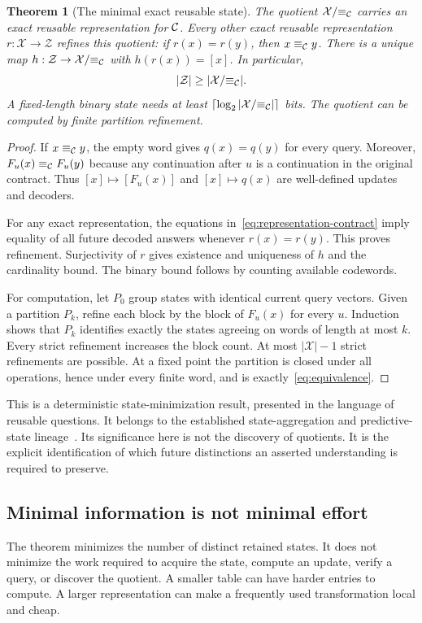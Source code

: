 \documentclass[11pt,letterpaper]{article}
\theoremstyle{plain}
\newtheorem{theorem}{Theorem}[section]
\theoremstyle{definition}
\newcommand{\X}{\mathcal X}\newcommand{\Z}{\mathcal Z}
\newcommand{\Eq}{\equiv_{\C}}\newcommand{\supp}{\operatorname{supp}}
\begin{document}
\begin{theorem}[The minimal exact reusable state]\label{thm:quotient}
The quotient $\X/{\Eq}$ carries an exact reusable representation for $\mathcal C$. Every other exact reusable representation $r:\X\to\Z$ refines this quotient: if $r(x)=r(y)$, then $x\Eq y$. There is a unique map $h:\Z\to\X/{\Eq}$ with $h(r(x))=[x]$. In particular,
\[
|\Z|\geq|\X/{\Eq}|.
\]
A fixed-length binary state needs at least $\lceil\log_2|\X/{\Eq}|\rceil$ bits. The quotient can be computed by finite partition refinement.
\end{theorem}
\begin{proof}
If $x\Eq y$, the empty word gives $q(x)=q(y)$ for every query. Moreover, $F_u(x)\Eq F_u(y)$ because any continuation after $u$ is a continuation in the original contract. Thus $[x]\mapsto[F_u(x)]$ and $[x]\mapsto q(x)$ are well-defined updates and decoders.

For any exact representation, the equations in~\eqref{eq:representation-contract} imply equality of all future decoded answers whenever $r(x)=r(y)$. This proves refinement. Surjectivity of $r$ gives existence and uniqueness of $h$ and the cardinality bound. The binary bound follows by counting available codewords.

For computation, let $P_0$ group states with identical current query vectors. Given a partition $P_k$, refine each block by the block of $F_u(x)$ for every $u$. Induction shows that $P_k$ identifies exactly the states agreeing on words of length at most $k$. Every strict refinement increases the block count. At most $|\X|-1$ strict refinements are possible. At a fixed point the partition is closed under all operations, hence under every finite word, and is exactly~\eqref{eq:equivalence}.
\end{proof}

This is a deterministic state-minimization result, presented in the language of reusable questions. It belongs to the established state-aggregation and predictive-state lineage~\cite{givan,shalizi}. Its significance here is not the discovery of quotients. It is the explicit identification of which future distinctions an asserted understanding is required to preserve.

\subsection{Minimal information is not minimal effort}
The theorem minimizes the number of distinct retained states. It does not minimize the work required to acquire the state, compute an update, verify a query, or discover the quotient. A smaller table can have harder entries to compute. A larger representation can make a frequently used transformation local and cheap.
\end{document}
